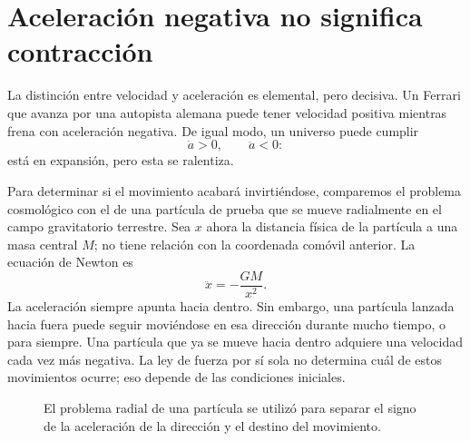 \section{Aceleración negativa no significa contracción}

La distinción entre velocidad y aceleración es elemental, pero decisiva. Un Ferrari que avanza por una autopista alemana puede tener velocidad positiva mientras frena con aceleración negativa. De igual modo, un universo puede cumplir
\begin{equation}
\dot a>0,
\qquad
\ddot a<0:
\end{equation}
está en expansión, pero esta se ralentiza.

Para determinar si el movimiento acabará invirtiéndose, comparemos el problema cosmológico con el de una partícula de prueba que se mueve radialmente en el campo gravitatorio terrestre. Sea \(x\) ahora la distancia física de la partícula a una masa central \(M\); no tiene relación con la coordenada comóvil anterior. La ecuación de Newton es
\begin{equation}
\ddot x=-\frac{GM}{x^2}.
\label{eq:c01-particle-force}
\end{equation}
La aceleración siempre apunta hacia dentro. Sin embargo, una partícula lanzada hacia fuera puede seguir moviéndose en esa dirección durante mucho tiempo, o para siempre. Una partícula que ya se mueve hacia dentro adquiere una velocidad cada vez más negativa. La ley de fuerza por sí sola no determina cuál de estos movimientos ocurre; eso depende de las condiciones iniciales.

\begin{classroomqa}
\end{classroomqa}

\begin{figure}[ht]
\centering
{}
\caption{El problema radial de una partícula se utilizó para separar el signo de la aceleración de la dirección y el destino del movimiento.}
\label{fig:c01-particle-sketch}
\end{figure}


